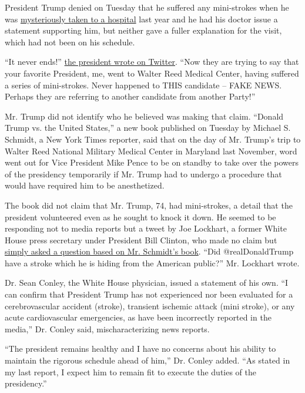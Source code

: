 President Trump denied on Tuesday that he suffered any mini-strokes when
he was
\href{https://www.nytimes3xbfgragh.onion/2019/11/17/us/politics/-trump-annual-physical.html}{mysteriously
taken to a hospital} last year and he had his doctor issue a statement
supporting him, but neither gave a fuller explanation for the visit,
which had not been on his schedule.

``It never ends!''
\href{https://twitter.com/realDonaldTrump/status/1300811758051954695}{the
president wrote on Twitter}. ``Now they are trying to say that your
favorite President, me, went to Walter Reed Medical Center, having
suffered a series of mini-strokes. Never happened to THIS candidate --
FAKE NEWS. Perhaps they are referring to another candidate from another
Party!''

Mr. Trump did not identify who he believed was making that claim.
``Donald Trump vs. the United States,'' a new book published on Tuesday
by Michael S. Schmidt, a New York Times reporter, said that on the day
of Mr. Trump's trip to Walter Reed National Military Medical Center in
Maryland last November, word went out for Vice President Mike Pence to
be on standby to take over the powers of the presidency temporarily if
Mr. Trump had to undergo a procedure that would have required him to be
anesthetized.

The book did not claim that Mr. Trump, 74, had mini-strokes, a detail
that the president volunteered even as he sought to knock it down. He
seemed to be responding not to media reports but a tweet by Joe
Lockhart, a former White House press secretary under President Bill
Clinton, who made no claim but
\href{https://twitter.com/joelockhart/status/130057470125373440}{simply
asked a question based on Mr. Schmidt's book}. ``Did @realDonaldTrump
have a stroke which he is hiding from the American public?'' Mr.
Lockhart wrote.

Dr. Sean Conley, the White House physician, issued a statement of his
own. ``I can confirm that President Trump has not experienced nor been
evaluated for a cerebrovascular accident (stroke), transient ischemic
attack (mini stroke), or any acute cardiovascular emergencies, as have
been incorrectly reported in the media,'' Dr. Conley said,
mischaracterizing news reports.

``The president remains healthy and I have no concerns about his ability
to maintain the rigorous schedule ahead of him,'' Dr. Conley added. ``As
stated in my last report, I expect him to remain fit to execute the
duties of the presidency.''

